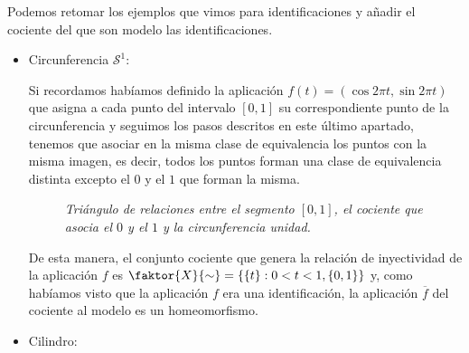 \begin{ej}
Podemos retomar los ejemplos que vimos para identificaciones y añadir el cociente del que son modelo las identificaciones.

\begin{itemize}
    \item Circunferencia $\mathcal{S}^1$:
    
    Si recordamos habíamos definido la aplicación $f(t) = \left( \cos 2\pi t, \sin 2\pi t \right)$ que asigna a cada punto del intervalo $[0,1]$ su correspondiente punto de la circunferencia y seguimos los pasos descritos en este último apartado, tenemos que asociar en la misma clase de equivalencia los puntos con la misma imagen, es decir, todos los puntos forman una clase de equivalencia distinta excepto el $0$ y el $1$ que forman la misma.
        
    \begin{figure}[H]
        \centering
        \caption{\textit{Triángulo de relaciones entre el segmento $[0,1]$, el cociente que asocia el $0$ y el $1$ y la circunferencia unidad.}}
	\end{figure}

	De esta manera, el conjunto cociente que genera la relación de inyectividad de la aplicación $f$ es $\faktor{X}{\sim} = \left\{ \left\{ t \right\} : 0 < t < 1, \left\{ 0, 1 \right\} \right\}$ y, como habíamos visto que la aplicación $f$ era una identificación, la aplicación $\overline{f}$ del cociente al modelo es un homeomorfismo.

	\item Cilindro:
	

\end{itemize}
\end{ej}
